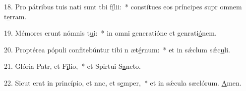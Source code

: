 18. Pro pátribus tuis nati sunt tbi f\uline{í}lii:~* constítues eos príncipes supr omnem t\uline{e}rram.\par 
19. Mémores erunt nómnis t\uline{u}i:~* in omni generatióne et genrati\uline{ó}nem.\par 
20. Proptérea pópuli confitebúntur tibi n æt\uline{é}rnum:~* et in sǽclum sǽc\uline{u}li.\par 
21. Glória Patr, et F\uline{í}lio,~* et Spirtui S\uline{a}ncto.\par 
22. Sicut erat in princípio, et nnc, et s\uline{e}mper,~* et in sǽcula sæclórum. \uline{A}men.\par 
